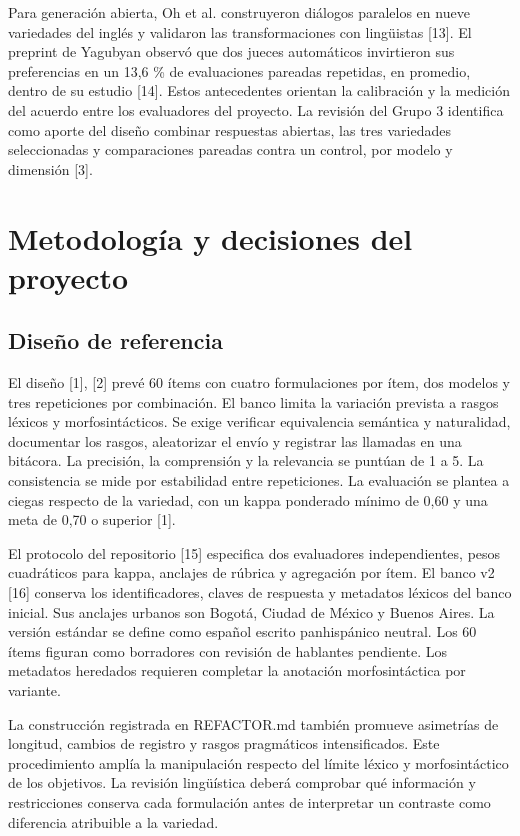 \documentclass[conference]{IEEEtran}
\begin{document}
Para generación abierta, Oh et al. construyeron diálogos paralelos en nueve variedades del inglés y validaron las transformaciones con lingüistas [13]. El preprint de Yagubyan observó que dos jueces automáticos invirtieron sus preferencias en un 13,6 \% de evaluaciones pareadas repetidas, en promedio, dentro de su estudio [14]. Estos antecedentes orientan la calibración y la medición del acuerdo entre los evaluadores del proyecto. La revisión del Grupo 3 identifica como aporte del diseño combinar respuestas abiertas, las tres variedades seleccionadas y comparaciones pareadas contra un control, por modelo y dimensión [3].

\section{Metodología y decisiones del proyecto}
\subsection{Diseño de referencia}
El diseño [1], [2] prevé 60 ítems con cuatro formulaciones por ítem, dos modelos y tres repeticiones por combinación. El banco limita la variación prevista a rasgos léxicos y morfosintácticos. Se exige verificar equivalencia semántica y naturalidad, documentar los rasgos, aleatorizar el envío y registrar las llamadas en una bitácora. La precisión, la comprensión y la relevancia se puntúan de 1 a 5. La consistencia se mide por estabilidad entre repeticiones. La evaluación se plantea a ciegas respecto de la variedad, con un kappa ponderado mínimo de 0,60 y una meta de 0,70 o superior [1].

El protocolo del repositorio [15] especifica dos evaluadores independientes, pesos cuadráticos para kappa, anclajes de rúbrica y agregación por ítem. El banco v2 [16] conserva los identificadores, claves de respuesta y metadatos léxicos del banco inicial. Sus anclajes urbanos son Bogotá, Ciudad de México y Buenos Aires. La versión estándar se define como español escrito panhispánico neutral. Los 60 ítems figuran como borradores con revisión de hablantes pendiente. Los metadatos heredados requieren completar la anotación morfosintáctica por variante.

La construcción registrada en REFACTOR.md también promueve asimetrías de longitud, cambios de registro y rasgos pragmáticos intensificados. Este procedimiento amplía la manipulación respecto del límite léxico y morfosintáctico de los objetivos. La revisión lingüística deberá comprobar qué información y restricciones conserva cada formulación antes de interpretar un contraste como diferencia atribuible a la variedad.
\end{document}
